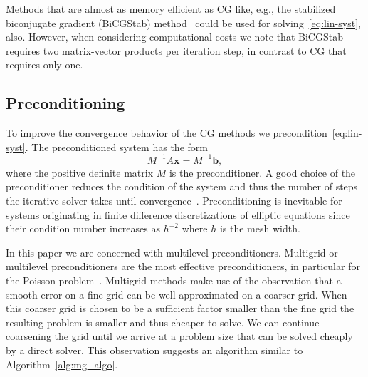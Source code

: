 Methods that are almost as memory efficient as CG like, e.g., the
stabilized biconjugate gradient (BiCGStab) method~\cite{vors:92} could
be used for solving~\eqref{eq:lin-syst}, also.  However, when
considering computational costs we note that BiCGStab requires two
matrix-vector products per iteration step, in contrast to CG that
requires only one.

\subsection{Preconditioning}

To improve the convergence behavior of the CG methods we
precondition~\eqref{eq:lin-syst}.  The preconditioned system has the
form
\begin{equation*}
  {M}^{-1}{A} \mathbf{x} = {M}^{-1}\mathbf{b},
\end{equation*}
where the positive definite matrix $M$ is the preconditioner.
A good choice of the preconditioner reduces the condition of the system
and thus the number of steps the iterative solver takes until
convergence~\cite{hack:94,gree:97}.  Preconditioning is inevitable for systems
originating in finite difference discretizations of elliptic equations since
their condition number increases as $h^{-2}$ where $h$ is the mesh width.

In this paper we are concerned with multilevel preconditioners.
Multigrid or multilevel preconditioners are the most effective
preconditioners, in particular for the Poisson
problem~\cite{hack:85,tros:00}.  Multigrid methods make use of the
observation that a smooth error on a fine grid can be well approximated
on a coarser grid.  When this coarser grid is chosen to be a sufficient
factor smaller than the fine grid the resulting problem is smaller and
thus cheaper to solve.  We can continue coarsening the grid until we
arrive at a problem size that can be solved cheaply by a direct solver.
This observation suggests an algorithm similar to
Algorithm~\ref{alg:mg_algo}.

